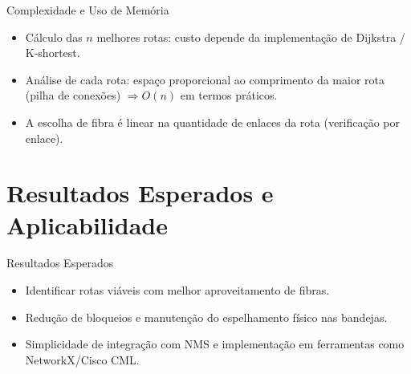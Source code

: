 \documentclass[aspectratio=169,xcolor=dvipsnames]{beamer}
\begin{document}
%
%
\begin{frame}{Complexidade e Uso de Memória}
  \begin{itemize}
    \item Cálculo das $n$ melhores rotas: custo depende da implementação de Dijkstra / K-shortest.
    \item Análise de cada rota: espaço proporcional ao comprimento da maior rota (pilha de conexões) $\Rightarrow O(n)$ em termos práticos.
    \item A escolha de fibra é linear na quantidade de enlaces da rota (verificação por enlace).
  \end{itemize}
\end{frame}

\section{Resultados Esperados e Aplicabilidade}
\begin{frame}{Resultados Esperados}
  \begin{itemize}
    \item Identificar rotas viáveis com melhor aproveitamento de fibras.
    \item Redução de bloqueios e manutenção do espelhamento físico nas bandejas.
    \item Simplicidade de integração com NMS e implementação em ferramentas como NetworkX/Cisco CML.
  \end{itemize}
\end{frame}
\end{document}
